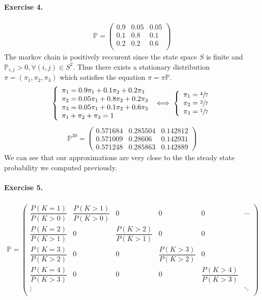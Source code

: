\documentclass{article}
\begin{document}
\paragraph{Exercise 4.}
\begin{align*}
\mathbb{P}=
\begin{pmatrix}
0.9 & 0.05 & 0.05 \\
0.1 & 0.8 & 0.1 \\
0.2 & 0.2 & 0.6 \\
\end{pmatrix}
\end{align*}
The markov chain is positively reccurent since the state space $S$ is finite and $\mathbb{P}_{i,j}>0, \forall (i,j) \in S^2$. Thus there exists a stationary distribution $\pi=(\pi_1,\pi_2,\pi_3)$ which satisfies the equation $\pi=\pi \mathbb{P}$.
$$\left \{
    \begin{array}{ll}
        \pi_1=0.9\pi_1+0.1\pi_2+0.2\pi_3 \\
		\pi_2=0.05\pi_1+0.8\pi_2+0.2\pi_3 \\
		\pi_3=0.05\pi_1+0.1\pi_2+0.6\pi_3 \\
		\pi_1+\pi_2+\pi_3=1
    \end{array}
\right. 
\iff 
\left \{
    \begin{array}{ll}
        \pi_1=\sfrac{4}{7}\\
		\pi_2=\sfrac{2}{7}\\
		\pi_3=\sfrac{1}{7}
    \end{array}
\right.$$
\begin{align*}
\mathbb{P}^{30}=
\begin{pmatrix}
0.571684 & 0.285504 & 0.142812 \\
0.571009 & 0.28606 & 0.142931 \\
0.571248 & 0.285863 & 0.142889
\end{pmatrix}
\end{align*}
We can see that our approximations are very close to the the steady state probability we computed previously.
\paragraph{Exercise 5.}

\begin{align*}
\mathbb{P}=
\begin{pmatrix}
\dfrac{P(K=1)}{P(K>0)} & \dfrac{P(K>1)}{P(K>0)} & 0 & 0 & 0  & \cdots  \\
\dfrac{P(K=2)}{P(K>1)} & 0 & \dfrac{P(K>2)}{P(K>1)} & 0 & 0 & \\
\dfrac{P(K=3)}{P(K>2)} & 0 & 0 & \dfrac{P(K>3)}{P(K>2)} & 0 &  \\
\dfrac{P(K=4)}{P(K>3)} & 0 & 0 & 0 & \dfrac{P(K>4)}{P(K>3)}  & \\
\vdots &  &  &   &    & \ddots \\
\end{pmatrix}
\end{align*}
\end{document}
